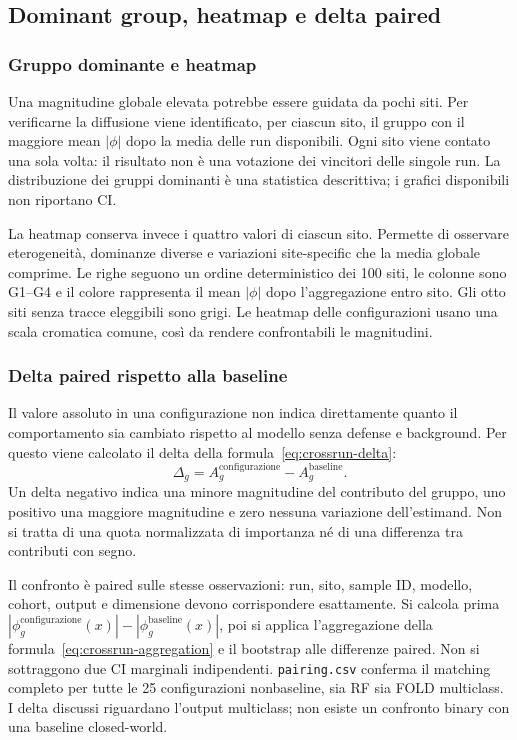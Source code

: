 \documentclass[11pt,a4paper]{article}
\begin{document}
\subsection{Dominant group, heatmap e delta paired}
\subsubsection{Gruppo dominante e heatmap}
Una magnitudine globale elevata potrebbe essere guidata da pochi siti. Per verificarne la diffusione viene identificato, per ciascun sito, il gruppo con il maggiore mean $|\phi|$ dopo la media delle run disponibili. Ogni sito viene contato una sola volta: il risultato non è una votazione dei vincitori delle singole run. La distribuzione dei gruppi dominanti è una statistica descrittiva; i grafici disponibili non riportano CI.

La heatmap conserva invece i quattro valori di ciascun sito. Permette di osservare eterogeneità, dominanze diverse e variazioni site-specific che la media globale comprime. Le righe seguono un ordine deterministico dei 100 siti, le colonne sono G1--G4 e il colore rappresenta il mean $|\phi|$ dopo l'aggregazione entro sito. Gli otto siti senza tracce eleggibili sono grigi. Le heatmap delle configurazioni usano una scala cromatica comune, così da rendere confrontabili le magnitudini.

\subsubsection{Delta paired rispetto alla baseline}
Il valore assoluto in una configurazione non indica direttamente quanto il comportamento sia cambiato rispetto al modello senza defense e background. Per questo viene calcolato il delta della formula~\ref{eq:crossrun-delta}:
\begin{equation}
 \Delta_g=A_g^{\mathrm{configurazione}}-A_g^{\mathrm{baseline}}.
 \label{eq:crossrun-delta}
\end{equation}
Un delta negativo indica una minore magnitudine del contributo del gruppo, uno positivo una maggiore magnitudine e zero nessuna variazione dell'estimand. Non si tratta di una quota normalizzata di importanza né di una differenza tra contributi con segno.

Il confronto è paired sulle stesse osservazioni: run, sito, sample ID, modello, cohort, output e dimensione devono corrispondere esattamente. Si calcola prima $|\phi_g^{\mathrm{configurazione}}(x)|-|\phi_g^{\mathrm{baseline}}(x)|$, poi si applica l'aggregazione della formula~\ref{eq:crossrun-aggregation} e il bootstrap alle differenze paired. Non si sottraggono due CI marginali indipendenti. \texttt{pairing.csv} conferma il matching completo per tutte le 25 configurazioni nonbaseline, sia RF sia FOLD multiclass. I delta discussi riguardano l'output multiclass; non esiste un confronto binary con una baseline closed-world.
\end{document}
